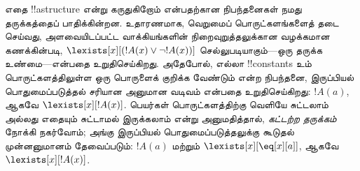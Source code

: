\documentclass[../../../include/open-logic-section]{subfiles}
\begin{document}
\begin{digress}
எதை !!a{structure} என்று கருதுகிறோம் என்பதற்கான நிபந்தனைகள் நமது
தருக்கத்தைப் பாதிக்கின்றன. உதாரணமாக, வெறுமைப் பொருட்களங்களைத் தடை செய்வது,
அளவையிடப்பட்ட வாக்கியங்களின் நிறைவுறுத்தலுக்கான வழக்கமான கணக்கின்படி,
$\lexists[x][(!A(x) \lor \lnot !A(x))]$ செல்லுபடியாகும்---ஒரு தருக்க
உண்மை---என்பதை உறுதிசெய்கிறது. அதேபோல், எல்லா !!{constant}s உம்
பொருட்களத்திலுள்ள ஒரு பொருளைக் குறிக்க வேண்டும் என்ற நிபந்தனை,
இருப்பியல் பொதுமைப்படுத்தல் சரியான அனுமான வடிவம் என்பதை உறுதிசெய்கிறது:
$!A(a)$, ஆகவே $\lexists[x][!A(x)]$. பெயர்கள் பொருட்களத்திற்கு வெளியே
சுட்டலாம் அல்லது எதையும் சுட்டாமல் இருக்கலாம் என்று அனுமதித்தால்,
\emph{கட்டற்ற தருக்கம்} நோக்கி நகர்வோம்; அங்கு இருப்பியல் பொதுமைப்படுத்தலுக்கு
கூடுதல் முன்னனுமானம் தேவைப்படும்: $!A(a)$ மற்றும்
$\lexists[x][\eq[x][a]]$, ஆகவே $\lexists[x][!A(x)]$.
\end{digress}
\end{document}
